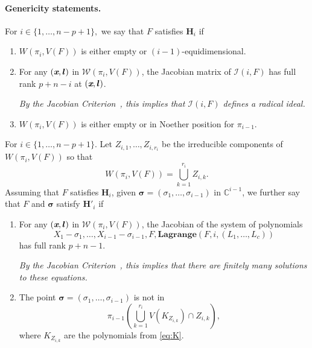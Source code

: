 \documentclass[a4paper]{article}
\def\lb{{\bm l}}
\def\xb{\textit{\textbf{x}}}
\def\C{\mathbb{C}}
\def\lagF{{\bm{Lagrange}}(F,i,(L_1,\hdots,L_c))}
\begin{document}
\paragraph*{Genericity statements.}
For $i \in \{1,\hdots,n-p+1\},$ we say that $F$ satisfies $\bm H_i$ if
%
%
\begin{enumerate}
\item  $W(\pi_i,V(F))$ is either empty or $(i-1)$-equidimensional.
\item For any $(\xb,\lb)$ in $\mathscr{W}(\pi_i,V(F))$, the Jacobian matrix of $\mathscr{I}(i,F)$ has full rank $p+n-i$ at $(\xb,\lb)$.  

{\em By the Jacobian Criterion~\cite[Corollary 16.20]{ECA}, this
  implies that $\mathscr{I}(i,F)$ defines a radical ideal.}
\item $W(\pi_i,V(F))$ is either empty or in Noether position for
  $\pi_{i-1}$.
\smallskip
\end{enumerate}
%
\noindent 
For $i \in \{1,\hdots,n-p+1\}.$ Let $Z_{i,1},\hdots,Z_{i,r_i}$ be the irreducible components of $W(\pi_i,V(F))$ so that
\[
W(\pi_i,V(F)) = \bigcup_{k=1}^{r_i} Z_{i,k}.
\] Assuming that $F$ satisfies $\bm H_i$, given $\bm \sigma = (\sigma_1,\hdots,\sigma_{i-1})$ 
in $\C^{i-1}$, we further say that $F$ and $\bm \sigma$ satisfy
$\textbf{H}'_i$ if
\begin{enumerate}
\item For any $(\xb,\lb)$ in $\mathscr{W}(\pi_i,V(F))$, the Jacobian of the system of polynomials  
\[
 X_1-\sigma_1,\dots,X_{i-1}-\sigma_{i-1},F, \lagF
\]
has full rank $p+n-1$. 

{\em By the Jacobian Criterion~\cite[Corollary 16.20]{ECA}, this implies that there are finitely many solutions to these equations.}

\item The point $\bm \sigma = (\sigma_1,\hdots,\sigma_{i-1})$ is not in 
\[\pi_{i-1} \left(\bigcup_{k=1}^{r_i} V(K_{Z_{i,k}}) \cap Z_{i,k}\right),\] 
where $K_{Z_{i,k}}$ are the polynomials from \ref{eq:K}.

\end{enumerate}
\end{document}
